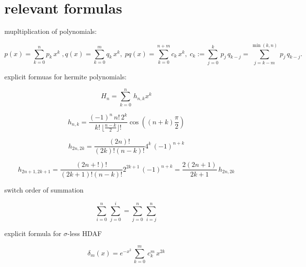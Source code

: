\documentclass{article}
\begin{document}
\section{relevant formulas}

\begin{flushleft}
mupltiplication of polynomials:
\end{flushleft}

\begin{equation*}
p(x) = \sum_{k=0}^n p_k \, x^k \;, q(x) = \sum_{k=0}^m q_k \, x^k, \; p  q (x) = \sum_{k=0}^{n+m} c_k \, x^k, \; c_k :=  \sum_{j=0}^k \, p_j \, q_{k-j} =  \sum_{j=k-m}^{\min(k,n)} \, p_j \, q_{k-j}.
\end{equation*}

\begin{flushleft}
explicit formuas for hermite polynomials:
\end{flushleft}

\begin{equation*}
H_{n} = \sum_{k=0}^n \, h_{n,k} x^k
\end{equation*}

\begin{equation*}
h_{n,k} = \frac{(-1)^n \, n! \, 2^k}{ k! \, \lfloor{\frac{n-k}{2}} \rfloor ! } \cos((n+k)\frac{\pi}{2})
\end{equation*}

\begin{equation*}
h_{2n,2k} = \frac{(2n)!}{(2k)!(n-k)!} 4^k \, (-1)^{n+k}
\end{equation*}

\begin{equation*}
h_{2n+1,2k+1} = \frac{(2n+!)!}{(2k+1)!(n-k)!} 2^{2k+1} \, (-1)^{n+k} = \frac{2(2n+1)}{2k+1} \, h_{2n,2k}
\end{equation*}


\begin{flushleft}
switch order of summation
\end{flushleft}

\begin{equation*}
\sum_{i=0}^n \, \sum_{j=0}^{i} = \sum_{j=0}^n \, \sum_{i=j}^{n}
\end{equation*}

\begin{flushleft}
explicit formula for $\sigma$-less HDAF
\end{flushleft}

\begin{equation*}
\delta_m(x) = e^{-x^2} \, \sum_{k=0}^m \, c_k^m \, x^{2k}
\end{equation*}
\end{document}
